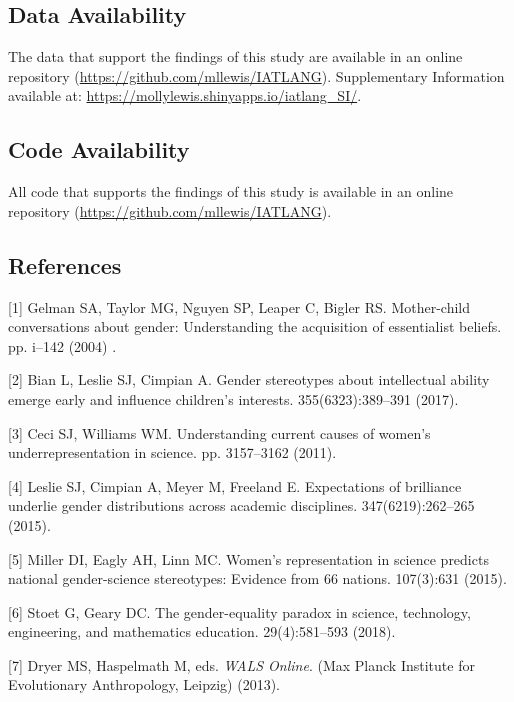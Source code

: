 \documentclass[9pt,twocolumn]{pnas-new}
\begin{document}
\subsection*{Data Availability}

The data that support the findings of this study are available in an online repository (\url{https://github.com/mllewis/IATLANG}). Supplementary Information available at:  \url{https://mollylewis.shinyapps.io/iatlang_SI/}. 

\subsection*{Code Availability}
All code that supports the findings of this study is available in an online repository (\url{https://github.com/mllewis/IATLANG}).

\subsection*{References}


[1] Gelman SA, Taylor MG, Nguyen SP, Leaper C, Bigler RS. Mother-child
  conversations about gender: Understanding the acquisition of essentialist
  beliefs.
 pp.
  i--142 (2004) .


[2] Bian L, Leslie SJ, Cimpian A. Gender stereotypes about intellectual
  ability emerge early and influence children's interests.
 355(6323):389--391  (2017).


[3] Ceci SJ, Williams WM. Understanding current causes of women's
  underrepresentation in science.
 pp. 3157--3162  (2011).


[4] Leslie SJ, Cimpian A, Meyer M, Freeland E. Expectations of brilliance
  underlie gender distributions across academic disciplines.
 347(6219):262--265 (2015).


[5] Miller DI, Eagly AH, Linn MC. Women's representation in science predicts
  national gender-science stereotypes: Evidence from 66 nations.
 107(3):631  (2015).


[6] Stoet G, Geary DC. The gender-equality paradox in science, technology,
  engineering, and mathematics education.
 29(4):581--593  (2018).


[7] Dryer MS, Haspelmath M, eds. {\em WALS Online}.
\newblock (Max Planck Institute for Evolutionary Anthropology, Leipzig) (2013).
  
\end{document}
